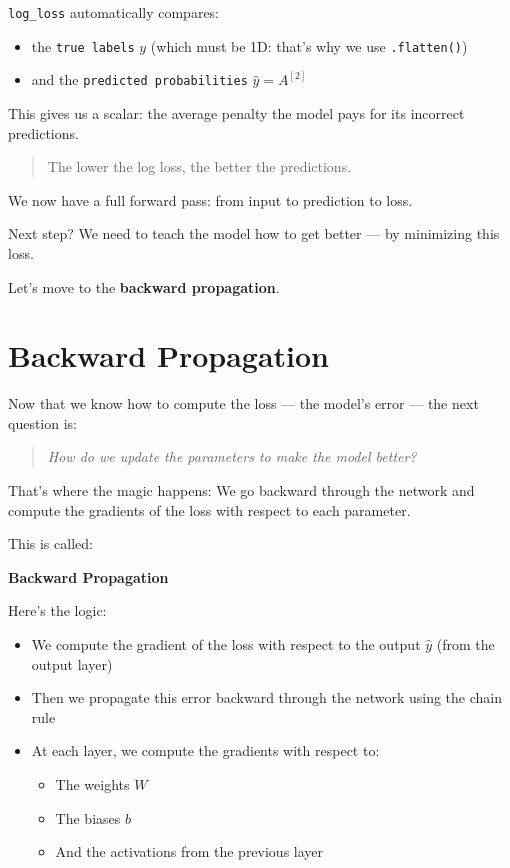 \documentclass[11pt]{article}
\begin{document}
\texttt{log\_loss} automatically compares:
\begin{itemize}
    \item the \texttt{true labels} $y$ (which must be 1D: that’s why we use \texttt{.flatten()})
    \item and the \texttt{predicted probabilities} $\hat{y} = A^{[2]}$
\end{itemize}

\bigskip

This gives us a scalar: the average penalty the model pays for its incorrect predictions.

\begin{quote}
The lower the log loss, the better the predictions.
\end{quote}

We now have a full forward pass: from input to prediction to loss.

Next step?  
We need to teach the model how to get better — by minimizing this loss.

Let’s move to the \textbf{backward propagation}.

\section*{Backward Propagation}

Now that we know how to compute the loss — the model’s error — the next question is:

\begin{quote}
\textit{How do we update the parameters to make the model better?}
\end{quote}

That’s where the magic happens:  
We go backward through the network and compute the gradients of the loss with respect to each parameter.

This is called:

\begin{center}
\LARGE \textbf{Backward Propagation}
\end{center}

\medskip

Here’s the logic:

\begin{itemize}
    \item We compute the gradient of the loss with respect to the output $\hat{y}$ (from the output layer)
    \item Then we propagate this error backward through the network using the chain rule
    \item At each layer, we compute the gradients with respect to:
        \begin{itemize}
            \item The weights $W$
            \item The biases $b$
            \item And the activations from the previous layer
        \end{itemize}
\end{itemize}
\end{document}
